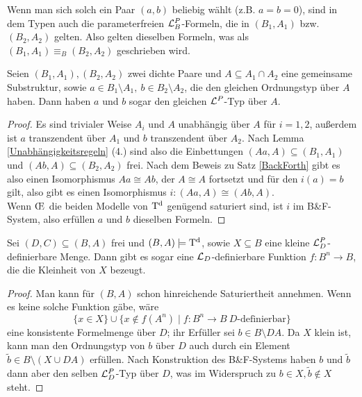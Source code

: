 \begin{corollary}
	Wenn man sich solch ein Paar $(a,b)$ beliebig wählt (z.B. $a=b=0$), sind in dem Typen auch die parameterfreien $\mathcal{L}^P_B$-Formeln, die in $(B_1,A_1)$ bzw. $(B_2,A_2)$ gelten. Also gelten dieselben Formeln, was als $(B_1,A_1)\equiv_B(B_2,A_2)$ geschrieben wird.
\end{corollary}

\begin{lemma}\label{selber Schnitt}
	Seien $(B_1,A_1),(B_2,A_2)$ zwei dichte Paare und $A\subseteq A_1\cap A_2$ eine gemeinsame Substruktur, sowie $a\in B_1\setminus A_1,\ b\in B_2\setminus A_2$, die den gleichen Ordnungstyp über $A$ haben. Dann haben $a$ und $b$ sogar den gleichen $\mathcal{L}^P$-Typ über $A$.
\end{lemma}
\begin{proof}
	Es sind trivialer Weise $A_i$ und $A$ unabhängig über $A$ für $i=1,2$, außerdem ist $a$ transzendent über $A_1$ und $b$ transzendent über $A_2$. Nach Lemma \ref{Unabhängigkeitsregeln} (4.) sind also die Einbettungen $(Aa,A)\subseteq(B_1,A_1)$ und $(Ab,A)\subseteq(B_2,A_2)$ frei. Nach dem Beweis zu Satz \ref{BackForth} gibt es also einen Isomorphismus $Aa\cong Ab$, der $A\cong A$ fortsetzt und für den $i(a)=b$ gilt, also gibt es einen Isomorphismus $i:(Aa,A)\cong(Ab,A)$.\\ Wenn \OE\ die beiden Modelle von $\operatorname{T^d}$ genügend saturiert sind, ist $i$ im B\&F-System, also erfüllen $a$ und $b$ dieselben Formeln.
\end{proof}

\begin{lemma}\label{Speziell definierbare kleine Mengen}
	Sei $(D,C)\subseteq(B,A)$ frei und $(B,A)\models\operatorname{T^d}$, sowie $X\subseteq B$ eine kleine $\mathcal{L}^P_D$-definierbare Menge. Dann gibt es sogar eine $\mathcal{L}_D$-definierbare Funktion $f:B^n\rightarrow B$, die die Kleinheit von $X$ bezeugt.
\end{lemma}
\begin{proof}
	Man kann für $(B,A)$ schon hinreichende Saturiertheit annehmen. Wenn es keine solche Funktion gäbe, wäre $$\{x\in X\}\cup\{x\notin f(A^n)\mid f:B^n\rightarrow B\ D\text{-definierbar}\}$$ eine konsistente Formelmenge über $D$; ihr Erfüller sei $b\in B\setminus DA$. Da $X$ klein ist, kann man den Ordnungstyp von $b$ über $D$ auch durch ein Element $\tilde{b}\in B\setminus(X\cup DA)$ erfüllen. Nach Konstruktion des B\&F-Systems haben $b$ und $\tilde{b}$ dann aber den selben $\mathcal{L}^P_D$-Typ über $D$, was im Widerspruch zu $b\in X,\tilde{b}\notin X$ steht.
\end{proof}

